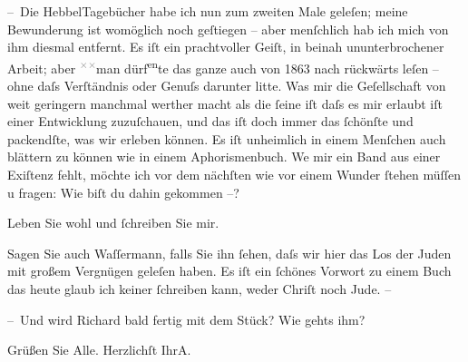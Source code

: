 \pstart
           – Die HebbelTagebücher habe ich nun zum zweiten Male
               geleſen; meine Bewunderung ist womöglich noch geſtiegen – aber menſchlich hab ich
               mich von ihm diesmal entfernt. Es iſt ein prachtvoller Geiſt, in beinah
               ununterbrochener Arbeit; aber \substVorne{}\textsuperscript{\textcolor{gray}{×}\-\textcolor{gray}{×}}\substDazwischen{}man\substHinten{} dürf\substVorne{}\textsuperscript{en}\substDazwischen{}te\substHinten{} das ganze auch von 1863 nach rückwärts leſen – ohne daſs
               Verſtändnis {\pb}oder Genuſs darunter litte. Was mir die
               Geſellschaft von weit geringern \introOben{}manchmal\introOben{} werther macht als
               die ſeine iſt daſs es mir erlaubt iſt einer Entwicklung zuzuſchauen, und das iſt doch
               immer das ſchönſte und packendſte, was wir erleben können. Es iſt unheimlich in einem
               Menſchen auch blättern zu können wie in einem Aphorismenbuch. We{\geminationn} mir ein Band aus einer Exiſtenz fehlt, möchte ich vor
                  {\pb}dem nächſten wie vor einem Wunder ſtehen müſſen u
               fragen: Wie biſt du dahin gekommen –?\pend
           
\pstart
           Leben Sie wohl und ſchreiben Sie mir.\pend
           
\pstart
           Sagen Sie auch Waſſermann, falls Sie ihn
               ſehen, daſs wir hier das Los der Juden mit
               großem Vergnügen geleſen haben. Es iſt ein ſchönes Vorwort zu einem Buch das heute
               glaub ich keiner ſchreiben kann, weder Chriſt noch Jude. –\pend
           
\pstart
           – Und wird Richard bald {\pb}fertig mit dem Stück? Wie gehts ihm?\pend
           
\pstart
           Grüßen Sie Alle.\pend
           \pstart Herzlichſt Ihr\spacefill\mbox{A.}\pend{}\endnumbering{}  
      